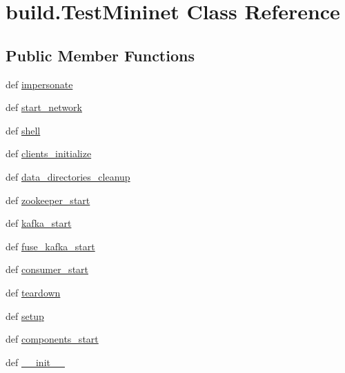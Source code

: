 \hypertarget{classbuild_1_1TestMininet}{\section{build.\-Test\-Mininet \-Class \-Reference}
\label{classbuild_1_1TestMininet}
}
\subsection*{\-Public \-Member \-Functions}
\begin{DoxyCompactItemize}
\item 
def \hyperlink{classbuild_1_1TestMininet_a8e289e361dade20ec1ad1c4e21cadd1a}{impersonate}
\item 
def \hyperlink{classbuild_1_1TestMininet_ae28256d061cb92ca35a47abfa3352c6f}{start\-\_\-network}
\item 
def \hyperlink{classbuild_1_1TestMininet_a7ae01ec8dc3e0a8d7768884a56dd2e96}{shell}
\item 
def \hyperlink{classbuild_1_1TestMininet_aa222c3691d93c73ac4e047e163fa791c}{clients\-\_\-initialize}
\item 
def \hyperlink{classbuild_1_1TestMininet_a83b14b12435ff9ffa7332fc2b8e197ae}{data\-\_\-directories\-\_\-cleanup}
\item 
def \hyperlink{classbuild_1_1TestMininet_aa3eddff2c619b28456be8a68dfe0c8cd}{zookeeper\-\_\-start}
\item 
def \hyperlink{classbuild_1_1TestMininet_abea6fef76c2d624f8ab4f9834fa30825}{kafka\-\_\-start}
\item 
def \hyperlink{classbuild_1_1TestMininet_a731ba3e4c942e40ebf114bfd1b01a287}{fuse\-\_\-kafka\-\_\-start}
\item 
def \hyperlink{classbuild_1_1TestMininet_a8239e151542b50fc2152cfd431a71095}{consumer\-\_\-start}
\item 
def \hyperlink{classbuild_1_1TestMininet_ab81a1d9ca2fcdee77ebcbf243fea4eb5}{teardown}
\item 
def \hyperlink{classbuild_1_1TestMininet_a9efe3ef9358f1f2c6078c415fe50b2df}{setup}
\item 
def \hyperlink{classbuild_1_1TestMininet_a595237e962e2bc7b55329097775624c8}{components\-\_\-start}
\item 
def \hyperlink{classbuild_1_1TestMininet_abab12f1966a20b7aacd47dcad5b978b1}{\-\_\-\-\_\-init\-\_\-\-\_\-}
\end{DoxyCompactItemize}
